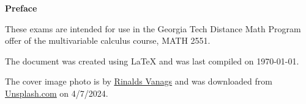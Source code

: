 \begin{center}
{\huge \textbf{Preface}}

\vspace{24pt}
These exams are intended for use in the Georgia Tech Distance Math Program offer of the multivariable calculus course, MATH 2551. 

\vspace{24pt}

The document was created using LaTeX and was last compiled on \today. 

\vspace{24pt}




  The cover image photo is by \href{https://unsplash.com/@vanagsphotography}{\underline{Rinalds Vanags}} and was downloaded from \href{https://unsplash.com/}{\underline{Unsplash.com}} on 4/7/2024.


\end{center}
